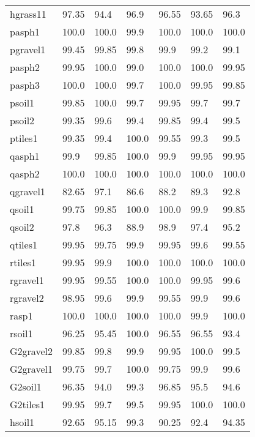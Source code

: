 \begin{table}
\begin{center}
\begin{adjustbox}{totalheight=\baselineskip}
\begin{tabular}{|l|l|l|l|l|l|l|}
		hgrass11 & 97.35 & \cellcolor{red!20}94.4 & 96.9 & 96.55 & \cellcolor{red!20}93.65 & 96.3\\
		pasph1 & 100.0 & 100.0 & 99.9 & 100.0 & 100.0 & 100.0\\
		pgravel1 & 99.45 & 99.85 & 99.8 & 99.9 & 99.2 & 99.1\\
		pasph2 & 99.95 & 100.0 & 99.0 & 100.0 & 100.0 & 99.95\\
		pasph3 & 100.0 & 100.0 & 99.7 & 100.0 & 99.95 & 99.85\\
		psoil1 & 99.85 & 100.0 & 99.7 & 99.95 & 99.7 & 99.7\\
		psoil2 & 99.35 & 99.6 & 99.4 & 99.85 & 99.4 & 99.5\\
		ptiles1 & 99.35 & 99.4 & 100.0 & 99.55 & 99.3 & 99.5\\
		qasph1 & 99.9 & 99.85 & 100.0 & 99.9 & 99.95 & 99.95\\
		qasph2 & 100.0 & 100.0 & 100.0 & 100.0 & 100.0 & 100.0\\
		qgravel1 & \cellcolor{red!20}82.65 & 97.1 & \cellcolor{red!20}86.6 & \cellcolor{red!20}88.2 & \cellcolor{red!20}89.3 & \cellcolor{red!20}92.8\\
		qsoil1 & 99.75 & 99.85 & 100.0 & 100.0 & 99.9 & 99.85\\
		qsoil2 & 97.8 & 96.3 & \cellcolor{red!20}88.9 & 98.9 & 97.4 & 95.2\\
		qtiles1 & 99.95 & 99.75 & 99.9 & 99.95 & 99.6 & 99.55\\
		rtiles1 & 99.95 & 99.9 & 100.0 & 100.0 & 100.0 & 100.0\\
		rgravel1 & 99.95 & 99.55 & 100.0 & 100.0 & 99.95 & 99.6\\
		rgravel2 & 98.95 & 99.6 & 99.9 & 99.55 & 99.9 & 99.6\\
		rasp1 & 100.0 & 100.0 & 100.0 & 100.0 & 99.9 & 100.0\\
		rsoil1 & 96.25 & 95.45 & 100.0 & 96.55 & 96.55 & \cellcolor{red!20}93.4\\
		G2gravel2 & 99.85 & 99.8 & 99.9 & 99.95 & 100.0 & 99.5\\
		G2gravel1 & 99.75 & 99.7 & 100.0 & 99.75 & 99.9 & 99.6\\
		G2soil1 & 96.35 & \cellcolor{red!20}94.0 & 99.3 & 96.85 & 95.5 & \cellcolor{red!20}94.6\\
		G2tiles1 & 99.95 & 99.7 & 99.5 & 99.95 & 100.0 & 100.0\\
		hsoil1 & \cellcolor{red!20}92.65 & 95.15 & 99.3 & \cellcolor{red!20}90.25 & \cellcolor{red!20}92.4 & \cellcolor{red!20}94.35\\

\end{tabular}
\end{adjustbox}
\end{center}
\end{table}
